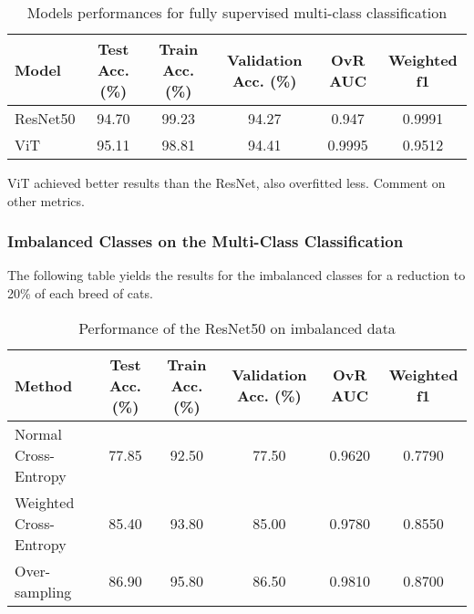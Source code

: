 \documentclass{article}
\begin{document}
\renewcommand{\arraystretch}{1.1} 
\begin{table}[H] %
    \centering %
    \caption{Models performances for fully supervised multi-class classification} %
    \label{tab:fully_multi_perf} %
    \begin{tabular}{|l|c|c|c|c|c|}
        \hline
        Model & Test Acc. (\%) & Train Acc. (\%) & Validation Acc. (\%) & OvR AUC & Weighted f1 \\
        \hline
        ResNet50 & 94.70 & 99.23 & 94.27 & 0.947 & 0.9991 \\
        ViT & 95.11 & 98.81 & 94.41 & 0.9995 & 0.9512\\
        \hline
    \end{tabular}
\end{table}

ViT achieved better results than the ResNet, also overfitted less. Comment on other metrics.

\subsubsection{Imbalanced Classes on the Multi-Class Classification}
The following table yields the results for the imbalanced classes for a reduction to 20\% of each breed of cats.

\renewcommand{\arraystretch}{1.1}
\begin{table}[H] %
    \centering %
    \caption{Performance of the ResNet50 on imbalanced data} %
    \label{tab:fully_multi_perf} %
    \begin{tabular}{|l|c|c|c|c|c|}
        \hline
        Method & Test Acc. (\%) & Train Acc. (\%) & Validation Acc. (\%) & OvR AUC & Weighted f1 \\
        \hline
        Normal Cross-Entropy & 77.85 & 92.50 & 77.50 & 0.9620 & 0.7790 \\ %
        Weighted Cross-Entropy & 85.40 & 93.80 & 85.00 & 0.9780 & 0.8550 \\ %
        Over-sampling & 86.90 & 95.80 & 86.50 & 0.9810 & 0.8700 \\ %
        \hline
    \end{tabular}
\end{table}
\end{document}
